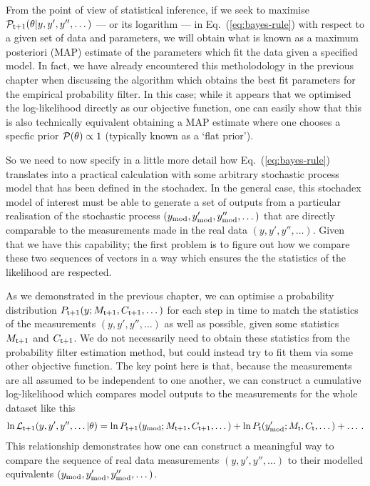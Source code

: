 From the point of view of statistical inference, if we seek to maximise ${\cal P}_{{\sf t}+1}(\theta \vert y, y', y'', \dots)$ --- or its logarithm --- in Eq.~(\ref{eq:bayes-rule}) with respect to a given set of data and parameters, we will obtain what is known as a maximum posteriori (MAP) estimate of the parameters which fit the data given a specified model. In fact, we have already encountered this metholodology in the previous chapter when discussing the algorithm which obtains the best fit parameters for the empirical probability filter. In this case; while it appears that we optimised the log-likelihood directly as our objective function, one can easily show that this is also technically equivalent obtaining a MAP estimate where one chooses a specfic prior ${\cal P} (\theta ) \propto 1$ (typically known as a `flat prior').

So we need to now specify in a little more detail how Eq.~(\ref{eq:bayes-rule}) translates into a practical calculation with some arbitrary stochastic process model that has been defined in the stochadex. In the general case, this stochadex model of interest must be able to generate a set of outputs from a particular realisation of the stochastic process $(y_{\rm mod}, y'_{\rm mod}, y''_{\rm mod}, \dots)$ that are directly comparable to the measurements made in the real data $(y, y', y'', \dots)$. Given that we have this capability; the first problem is to figure out how we compare these two sequences of vectors in a way which ensures the the statistics of the likelihood are respected. 

As we demonstrated in the previous chapter, we can optimise a probability distribution $P_{{\sf t}+1}(y;M_{{\sf t}+1},C_{{\sf t}+1},\dots )$ for each step in time to match the statistics of the measurements $(y, y', y'', \dots)$ as well as possible, given some statistics $M_{{\sf t}+1}$ and $C_{{\sf t}+1}$. We do not necessarily need to obtain these statistics from the probability filter estimation method, but could instead try to fit them via some other objective function. The key point here is that, because the measurements are all assumed to be independent to one another, we can construct a cumulative log-likelihood which compares model outputs to the measurements for the whole dataset like this
\begin{align}
\ln {\cal L}_{{\sf t}+1}(y, y',y'', \dots\vert \theta ) = \ln P_{{\sf t}+1}(y_{\rm mod};M_{{\sf t}+1},C_{{\sf t}+1},\dots ) + \ln P_{{\sf t}}(y'_{\rm mod};M_{{\sf t}},C_{{\sf t}},\dots ) + \dots \label{eq:data-likelihood-for-model} \,.
\end{align}
This relationship demonstrates how one can construct a meaningful way to compare the sequence of real data measurements $(y, y', y'', \dots)$ to their modelled equivalents $(y_{\rm mod}, y'_{\rm mod}, y''_{\rm mod}, \dots)$.


